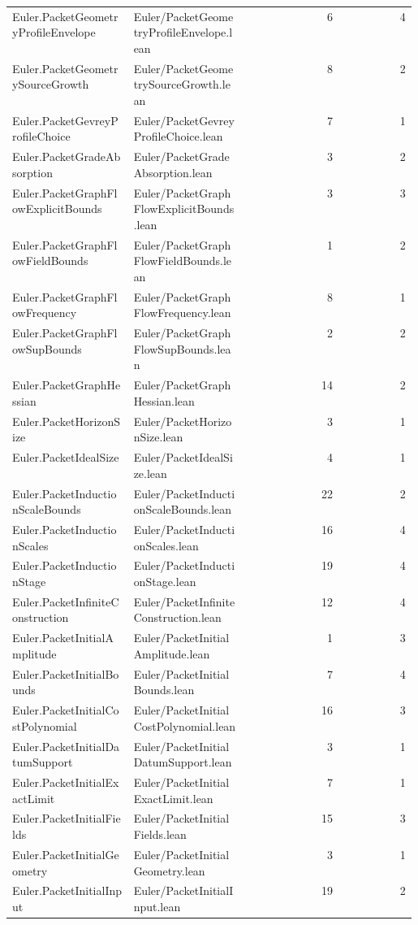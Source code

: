 \begin{longtable}{p{0.30\linewidth}p{0.28\linewidth}rr}
Euler.PacketGeometryProfileEnvelope & Euler/PacketGeometryProfileEnvelope.lean & 6 & 4\\
Euler.PacketGeometrySourceGrowth & Euler/PacketGeometrySourceGrowth.lean & 8 & 2\\
Euler.PacketGevreyProfileChoice & Euler/PacketGevreyProfileChoice.lean & 7 & 1\\
Euler.PacketGradeAbsorption & Euler/PacketGradeAbsorption.lean & 3 & 2\\
Euler.PacketGraphFlowExplicitBounds & Euler/PacketGraphFlowExplicitBounds.lean & 3 & 3\\
Euler.PacketGraphFlowFieldBounds & Euler/PacketGraphFlowFieldBounds.lean & 1 & 2\\
Euler.PacketGraphFlowFrequency & Euler/PacketGraphFlowFrequency.lean & 8 & 1\\
Euler.PacketGraphFlowSupBounds & Euler/PacketGraphFlowSupBounds.lean & 2 & 2\\
Euler.PacketGraphHessian & Euler/PacketGraphHessian.lean & 14 & 2\\
Euler.PacketHorizonSize & Euler/PacketHorizonSize.lean & 3 & 1\\
Euler.PacketIdealSize & Euler/PacketIdealSize.lean & 4 & 1\\
Euler.PacketInductionScaleBounds & Euler/PacketInductionScaleBounds.lean & 22 & 2\\
Euler.PacketInductionScales & Euler/PacketInductionScales.lean & 16 & 4\\
Euler.PacketInductionStage & Euler/PacketInductionStage.lean & 19 & 4\\
Euler.PacketInfiniteConstruction & Euler/PacketInfiniteConstruction.lean & 12 & 4\\
Euler.PacketInitialAmplitude & Euler/PacketInitialAmplitude.lean & 1 & 3\\
Euler.PacketInitialBounds & Euler/PacketInitialBounds.lean & 7 & 4\\
Euler.PacketInitialCostPolynomial & Euler/PacketInitialCostPolynomial.lean & 16 & 3\\
Euler.PacketInitialDatumSupport & Euler/PacketInitialDatumSupport.lean & 3 & 1\\
Euler.PacketInitialExactLimit & Euler/PacketInitialExactLimit.lean & 7 & 1\\
Euler.PacketInitialFields & Euler/PacketInitialFields.lean & 15 & 3\\
Euler.PacketInitialGeometry & Euler/PacketInitialGeometry.lean & 3 & 1\\
Euler.PacketInitialInput & Euler/PacketInitialInput.lean & 19 & 2\\

\end{longtable}
